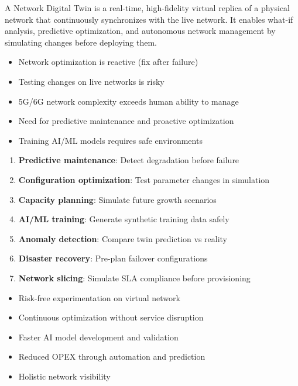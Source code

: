 \CNchained{}

A Network Digital Twin is a real-time, high-fidelity virtual replica of a physical network that continuously synchronizes with the live network. It enables what-if analysis, predictive optimization, and autonomous network management by simulating changes before deploying them.


\begin{itemize}
\tightlist
\item
  Network optimization is reactive (fix after failure)
\item
  Testing changes on live networks is risky
\item
  5G/\allowbreak{}6G network complexity exceeds human ability to manage
\item
  Need for predictive maintenance and proactive optimization
\item
  Training AI/\allowbreak{}ML models requires safe environments
\end{itemize}





\begin{enumerate}
\def\labelenumi{\arabic{enumi}.}
\tightlist
\item
  \textbf{Predictive maintenance}: Detect degradation before failure
\item
  \textbf{Configuration optimization}: Test parameter changes in simulation
\item
  \textbf{Capacity planning}: Simulate future growth scenarios
\item
  \textbf{AI/\allowbreak{}ML training}: Generate synthetic training data safely
\item
  \textbf{Anomaly detection}: Compare twin prediction vs reality
\item
  \textbf{Disaster recovery}: Pre-plan failover configurations
\item
  \textbf{Network slicing}: Simulate SLA compliance before provisioning
\end{enumerate}


\begin{itemize}
\tightlist
\item
  Risk-free experimentation on virtual network
\item
  Continuous optimization without service disruption
\item
  Faster AI model development and validation
\item
  Reduced OPEX through automation and prediction
\item
  Holistic network visibility
\end{itemize}

